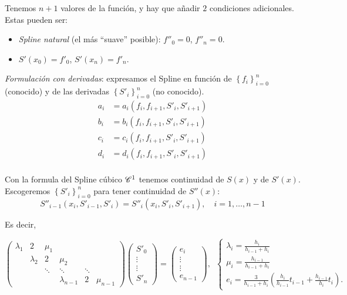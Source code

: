 Tenemos $n+1$ valores de la función, y hay que añadir $2$ condiciones adicionales. Estas pueden ser:

\begin{itemize}
    \item \emph{Spline natural} (el más ``suave'' posible): $f''_0 = 0$, $f''_n = 0$.
    \item $S'\left( x_0 \right) = f'_0$, $S'\left( x_n \right) = f'_n$.
\end{itemize}

\emph{Formulación con derivadas}: expresamos el Spline en función de $\left\{ f_i \right\}_{i=0}^n$ (conocido) y de las derivadas $\left\{ S'_i \right\}_{i=0}^n$ (no conocido).
\begin{align*}
    a_i &= a_i\left( f_i, f_{i+1}, S'_i,S'_{i+1} \right) \\
    b_i &= b_i\left( f_i, f_{i+1}, S'_i,S'_{i+1} \right) \\
    c_i &= c_i\left( f_i, f_{i+1}, S'_i,S'_{i+1} \right) \\
    d_i &= d_i\left( f_i, f_{i+1}, S'_i,S'_{i+1} \right) \\
\end{align*}

Con la formula del Spline cúbico $\mathscr{C}^1$ tenemos continuidad de $S(x)$ y de $S'(x)$. Escogeremos $\left\{ S'_i \right\}_{i=0}^n$ para tener continuidad de $S''(x)$:
\[
    S''_{i-1}\left( x_i, S'_{i-1}, S'_i \right) = S''_i\left( x_i, S'_i, S'_{i+1} \right),\quad i = 1, \dots, n-1
\]

Es decir,

\[
\begin{pmatrix}
    \lambda_1   & 2 & \mu_1 & \\
    & \lambda_2 & 2 & \mu_2 & & \\
    & & \ddots    & \ddots & \ddots & \\
    & & & \lambda_{n-1} & 2 & \mu_{n-1} 
\end{pmatrix}
\begin{pmatrix}
    S'_0 \\
    \vdots \\
    \vdots \\
    S'_n
\end{pmatrix}
=
\begin{pmatrix}
    e_i \\
    \vdots \\
    \vdots \\
    e_{n-1}
\end{pmatrix}
,\,\,\,
\begin{cases}
    \lambda_i = \frac{h_i}{h_{i-1} + h_i} \\
    \mu_i = \frac{h_{i-1}}{h_{i-1}+h_i} \\
    e_i = \frac{3}{h_{i-1} + h_i}\left( \frac{h_i}{h_{i-1}}t_{i-1} + \frac{h_{i-1}}{h_i}t_i \right).
\end{cases}
\]

